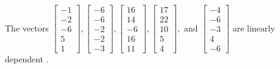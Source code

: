 \begin{exercise}
\begin{exerciseStatement}
  \end{exerciseStatement}
  \begin{exerciseAnswer}
   The vectors \(\left[\begin{array}{r}
-1 \\
-2 \\
-6 \\
5 \\
1
\end{array}\right] , \left[\begin{array}{r}
-6 \\
-6 \\
-2 \\
-2 \\
-3
\end{array}\right] , \left[\begin{array}{r}
16 \\
14 \\
-6 \\
16 \\
11
\end{array}\right] , \left[\begin{array}{r}
17 \\
22 \\
10 \\
5 \\
4
\end{array}\right] , \text{ and } \left[\begin{array}{r}
-4 \\
-6 \\
-3 \\
4 \\
-6
\end{array}\right]\) are 
  	 linearly dependent  .
  


  \end{exerciseAnswer}
\end{exercise}
